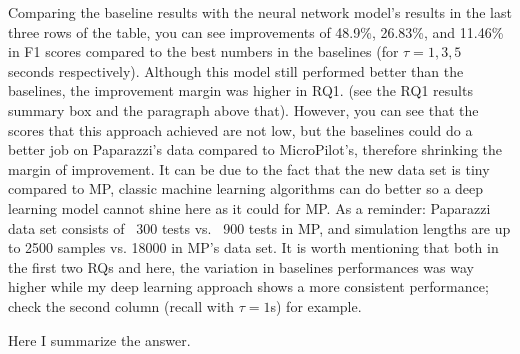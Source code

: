 Comparing the baseline results with the neural network model's results in the last three rows of the table, you can see improvements of 48.9\%, 26.83\%, and 11.46\% in F1 scores compared to the best numbers in the baselines (for $\tau = 1, 3, 5$ seconds respectively). Although this model still performed better than the baselines, the improvement margin was higher in RQ1. (see the RQ1 results summary box and the paragraph above that). %
However, you can see that the scores that this approach achieved are not low, but the baselines could do a better job on Paparazzi's data compared to MicroPilot's, therefore shrinking the margin of improvement. 
It can be due to the fact that the new data set is tiny compared to MP, classic machine learning algorithms can do better so a deep learning model cannot shine here as it could for MP. 
As a reminder: Paparazzi data set consists of ~300 tests vs. ~900 tests in MP, and simulation lengths are up to 2500 samples vs. 18000 in MP's data set. 
It is worth mentioning that both in the first two RQs and here, the variation in baselines performances was way higher while my deep learning approach shows a more consistent performance; check the second column (recall with $\tau=1$s) for example. 

\begin{rqanswer}
Here I summarize the answer.
\end{rqanswer}

